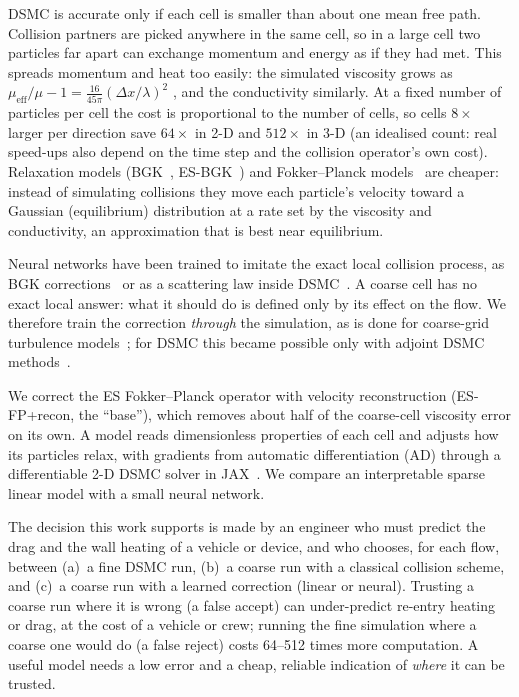 \documentclass[10pt]{article}
\newcommand{\dx}{\Delta x}
\begin{document}
DSMC is accurate only if each cell is smaller than about one mean free path. Collision partners
are picked anywhere in the same cell, so in a large cell two particles far apart can exchange
momentum and energy as if they had met. This spreads momentum and heat too easily: the simulated
viscosity grows as $\mu_\mathrm{eff}/\mu-1=\tfrac{16}{45\pi}(\dx/\lambda)^2$
\citep{alexander1998,hadjiconstantinou2000}, and the conductivity similarly. At a fixed number of particles per cell the cost is proportional to the number of cells, so
cells $8\times$ larger per direction save $64\times$ in 2-D and $512\times$ in 3-D (an idealised
count: real speed-ups also depend on the time step and the collision operator's own cost). Relaxation models
(BGK~\citep{bgk1954}, ES-BGK~\citep{holway1966}) and Fokker--Planck models~\citep{jenny2010,
gorji2011,mathiaud2016,fei2020} are cheaper: instead of simulating collisions they move each particle's velocity toward a
Gaussian (equilibrium) distribution at a rate set by the viscosity and conductivity, an
approximation that is best near equilibrium.

Neural networks have been trained to imitate the exact local collision process, as BGK
corrections~\citep{xiao2021,miller2022} or as a scattering law inside DSMC~\citep{roohi2026}. A
coarse cell has no exact local answer: what it should do is defined only by its effect on the
flow. We therefore train the correction \emph{through} the simulation, as is done for coarse-grid
turbulence models~\citep{um2020,kochkov2021,macart2021}; for DSMC this became possible only with
adjoint DSMC methods~\citep{caflisch2026}.

We correct the ES Fokker--Planck operator with velocity reconstruction (ES-FP+recon, the
``base''), which removes about half of the coarse-cell viscosity error on its own. A model reads
dimensionless properties of each cell and adjusts how its particles relax, with gradients from
automatic differentiation (AD) through a differentiable 2-D DSMC solver in JAX~\citep{jax2018}.
We compare an interpretable sparse linear model with a small neural network.

The decision this work supports is made by an engineer who must predict the drag and the
wall heating of a vehicle or device, and who chooses, for each flow, between (a)~a fine DSMC run,
(b)~a coarse run with a classical collision scheme, and (c)~a coarse run with a learned
correction (linear or neural). Trusting a coarse run where it is wrong (a false accept) can under-predict re-entry heating or
drag, at the cost of a vehicle or crew; running the fine simulation where a coarse one would do
(a false reject) costs 64--512 times more computation. A useful model needs a low error and a
cheap, reliable indication of \emph{where} it can be trusted.
\end{document}
